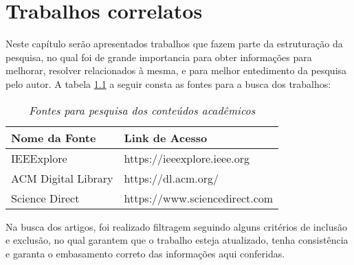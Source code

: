 \chapter{Trabalhos correlatos}\label{ch:trabalhos-correlatos}

Neste capítulo serão apresentados trabalhos que fazem parte da
estruturação da pesquisa, no qual foi de grande importancia para
obter informações para melhorar, resolver relacionados à mesma, e
para melhor entedimento da pesquisa pelo autor.
A tabela \ref{tab:fontes-pesquisa} a seguir consta as fontes para a
busca dos trabalhos:

\begin{table}[h!]
    \centering
    \begin{tabular}{|m{4cm}|m{4.5cm}|}
        \hline
        Nome da Fonte       & Link de Acesso                \\ \hline
        IEEExplore          & https://ieeexplore.ieee.org   \\ \hline
        ACM Digital Library & https://dl.acm.org/           \\ \hline
        Science Direct      & https://www.sciencedirect.com \\ \hline
    \end{tabular}
    \caption[Fontes de pesquisa]{\textit{Fontes para pesquisa dos
    conteúdos acadêmicos}}
    \label{tab:fontes-pesquisa}
\end{table}

Na busca dos artigos, foi realizado filtragem seguindo alguns
critérios de inclusão e exclusão, no qual garantem que o trabalho
esteja atualizado, tenha consistência e garanta o embasamento
correto das informações aqui conferidas.

